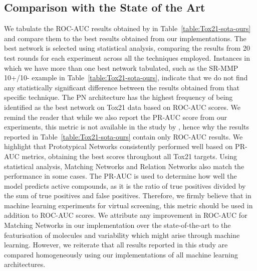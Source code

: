 \subsection{Comparison with the State of the Art}

We tabulate the ROC-AUC results obtained by \citet{altae2017low} in Table~\ref{table:Tox21-sota-ours} and compare them to the best results obtained from our implementations. The best network is selected using statistical analysis, comparing the results from 20 test rounds for each experiment across all the techniques employed. Instances in which we have more than one best network tabulated, such as the SR-MMP 10+/10- example in Table~\ref{table:Tox21-sota-ours}, indicate that we do not find any statistically significant difference between the results obtained from that specific technique. The PN architecture has the highest frequency of being identified as the best network on Tox21 data based on ROC-AUC scores. We remind the reader that while we also report the PR-AUC score from our experiments, this metric is not available in the study by \citet{altae2017low}, hence why the results reported in Table~\ref{table:Tox21-sota-ours} contain only ROC-AUC results. We highlight that Prototypical Networks consistently performed well based on PR-AUC metrics, obtaining the best scores throughout all Tox21 targets. Using statistical analysis, Matching Networks and Relation Networks also match the performance in some cases. The PR-AUC is used to determine how well the model predicts active compounds, as it is the ratio of true positives divided by the sum of true positives and false positives. Therefore, we firmly believe that in machine learning experiments for virtual screening, this metric should be used in addition to ROC-AUC scores. We attribute any improvement in ROC-AUC for Matching Networks in our implementation over the state-of-the-art to the featurisation of molecules and variability which might arise through machine learning. However, we reiterate that all results reported in this study are compared homogeneously using our implementations of all machine learning architectures.

